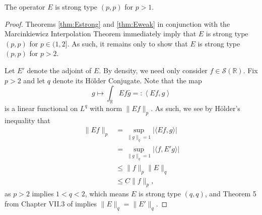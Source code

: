 \documentclass[../dissertation.tex]{subfiles}
\begin{document}
\begin{thm}\label{thm:EbndOp}
	The operator $E$ is strong type $(p, p)$ for $p>1$.
\end{thm}
\begin{proof}
	Theorems \ref{thm:Estrong} and \ref{thm:Eweak} in conjunction with the 
	Marcinkiewicz Interpolation Theorem \cite[Theorem 1.3.2]{Grafakos} immediately imply that $E$ is strong
	type $(p,p)$ for $p\in (1, 2]$. As such, it remains only to show that
	$E$ is strong type $(p, p)$ for $p > 2$. 

    Let $E'$ denote the adjoint of $E$. By density, we need only consider 
    $f \in \mathscr S(\mathbb R)$. Fix $p >2$ and let $q$ 
    denote its H\"older Conjugate. Note that the map
    \[
        g \mapsto \int_{\mathbb R} E f \bar{g} =: \left\langle Ef, g \right\rangle 
    \]
    is a linear functional on $L^q$ with norm $\| E f \|_p$. As such, 
    we see by H\"older's inequality that
    \begin{align*}
        \| E f \|_p
            &= \sup_{\|g\|_q = 1} |\langle Ef, g \rangle| \\
            &= \sup_{\|g\|_q = 1} |\langle f, E'g \rangle| \\
            &\leq  \|f\|_p \|E\|_q \\
            &\leq  C \|f\|_p,
    \end{align*}
    as $p>2$ implies $1 < q < 2$, which means $E$ is strong type $(q, q)$, 
    and Theorem 5 from Chapter VII.3 of \cite{yosida} implies 
    $\|E\|_q = \|E'\|_q$.
\end{proof}
\end{document}
